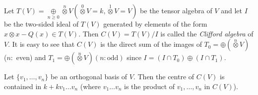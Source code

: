 Let $T(V)=\mathop{\oplus}\limits_{n\geq
  0}\mathop{\otimes}\limits^{n}V(\mathop{\otimes}\limits^{0}V=k,\mathop{\otimes}\limits^{1}V=V)$
be the tensor algebra of $V$ and let $I$ be the two-sided ideal of
$T(V)$ generated by elements of the form $x\otimes x-Q(x)\in
T(V)$. Then $C(V)=T(V)/I$ is called the {\em Clifford algebra} of
$V$. It is easy to see that $C(V)$ is the direct sum of the images of
$T_{0}=\oplus (\mathop{\otimes}\limits^{n}V)$ ($n:$ even) and
$T_{1}=\oplus (\mathop{\otimes}\limits^{n}V)(n:\text{odd})$ since $I=(I\cap
T_{0})\oplus (I\cap T_{1})$.

\setcounter{lemma}{14}
\begin{lemma}\label{c2:lem-2.15}
Let $\{v_{1},\ldots,v_{n}\}$ be an orthogonal basis of $V$. Then the
centre of $C(V)$ is contained in $k+kv_{1}\ldots v_{n}$ (where
$v_{1}\ldots v_{n}$ is the product of $v_{1},\ldots,v_{n}$ in $C(V)$).
\end{lemma}


